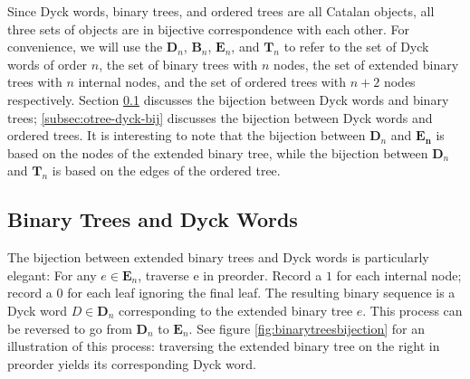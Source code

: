 Since Dyck words, binary trees, and ordered trees are all Catalan objects, all three sets of objects are in bijective correspondence with each other.  For convenience, we will use the $\mathbf{D}_n$, $\mathbf{B}_n$, $\mathbf{E}_n$, and $\mathbf{T}_n$ to refer to the set of Dyck words of order $n$, the set of binary trees with $n$ nodes, the set of extended binary trees with $n$ internal nodes, and the set of ordered trees with $n+2$ nodes respectively.  Section \ref{subsec:bintree-dyck-bij} discusses the bijection between Dyck words and binary trees; \ref{subsec:otree-dyck-bij} discusses the bijection between Dyck words and ordered trees.  It is interesting to note that the bijection between $\mathbf{D}_n$ and $\mathbf{E_n}$ is based on the nodes of the extended binary tree, while the bijection between $\mathbf{D}_n$ and $\mathbf{T}_n$ is based on the edges of the ordered tree.

\subsection{Binary Trees and Dyck Words} \label{subsec:bintree-dyck-bij}

The bijection between extended binary trees and Dyck words is particularly elegant: 
For any $e \in \mathbf{E}_n$, traverse e in preorder.  Record a $1$ for each internal node; record a $0$ for each leaf ignoring the final leaf. The resulting binary sequence is a Dyck word  $D \in \mathbf{D}_n $ corresponding to the extended binary tree $e$.  This process can be reversed to go from $\mathbf{D}_n$ to $\mathbf{E}_n$.  See figure \ref{fig:binarytreesbijection} for an illustration of this process: traversing the extended binary tree on the right in preorder yields its corresponding Dyck word.

